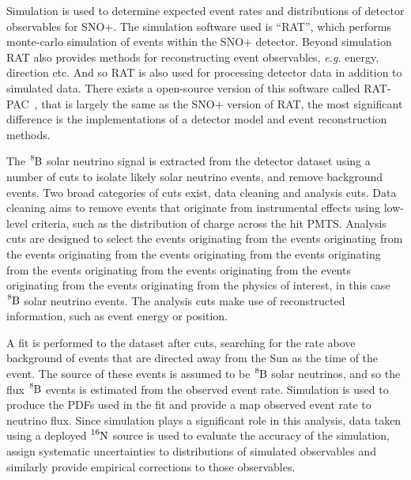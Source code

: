 Simulation is used to determine expected event rates and distributions of
detector observables for SNO+.
The simulation software used is ``RAT'', which performs monte-carlo
simulation of events within the SNO+ detector.
Beyond simulation RAT also provides methods for reconstructing event
observables, \textit{e.g.} energy, direction etc.
And so RAT is also used for processing detector data in addition
to simulated data.
There exists a open-source version of this software called
RAT-PAC~\cite{ratpac}, that is largely the same as the SNO+ version of RAT,
the most significant difference is the implementations of a detector model
and event reconstruction methods.

The $\ce{^{8}B}$ solar neutrino signal is extracted from the detector dataset
using a number of cuts to isolate likely solar neutrino events, and remove
background events.
Two broad categories of cuts exist, data cleaning and analysis cuts.
Data cleaning aims to remove events that originate from instrumental effects using
low-level criteria, such as the distribution of charge across the hit PMTS\@.
Analysis cuts are designed to select the events originating from the events originating from the events originating from the events originating from the events originating from the events originating from the events originating from the events originating from the events originating from the physics of interest, in this case
$\ce{^{8}B}$ solar neutrino events.
The analysis cuts make use of reconstructed information, such as event energy
or position.

A fit is performed to the dataset after cuts, searching for the rate above background of events
that are directed away from the Sun as the time of the event.
The source of these events is assumed to be $\ce{^{8}B}$ solar neutrinos, and
so the flux $\ce{^{8}B}$ events is estimated from the observed event rate.
Simulation is used to produce the PDFs used in the fit and provide a map observed
event rate to neutrino flux.
Since simulation plays a significant role in this analysis, data taken using
a deployed $\ce{^{16}N}$ source is used to evaluate the accuracy of the
simulation, assign systematic uncertainties to distributions of simulated observables
and similarly provide empirical corrections to those observables.









